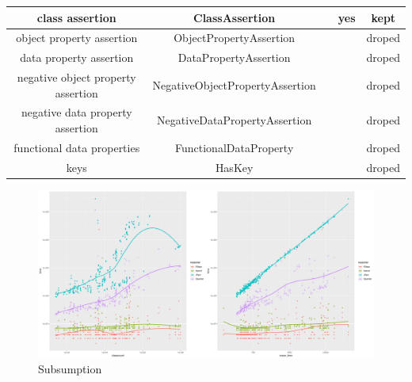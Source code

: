 \documentclass[a4paper]{article}
\begin{document}
\begin{center}
\begin{tabular}{|c | c | c | c| c|}
		\hline
		class assertion                                  & ClassAssertion                   &               & yes                          & kept          \\
		\hline
		object property assertion                        & ObjectPropertyAssertion          &               &                              & droped        \\
		\hline
		data property assertion                          & DataPropertyAssertion            &               &                              & droped        \\
		\hline
		negative object property assertion               & NegativeObjectPropertyAssertion  &               &                              & droped        \\
		\hline
		negative data property assertion                 & NegativeDataPropertyAssertion    &               &                              & droped        \\
		\hline
		functional data properties                       & FunctionalDataProperty           &               &                              & droped        \\
		\hline
		keys                                             & HasKey                           &               &                              & droped        \\
		\hline
	\end{tabular}
\end{center}

\begin{figure}[ht]
	\centering
	\includegraphics[width=15cm]{fig/subsumption.pdf}
	\caption{Subsumption}
	\label{fig2}
\end{figure}
\end{document}
